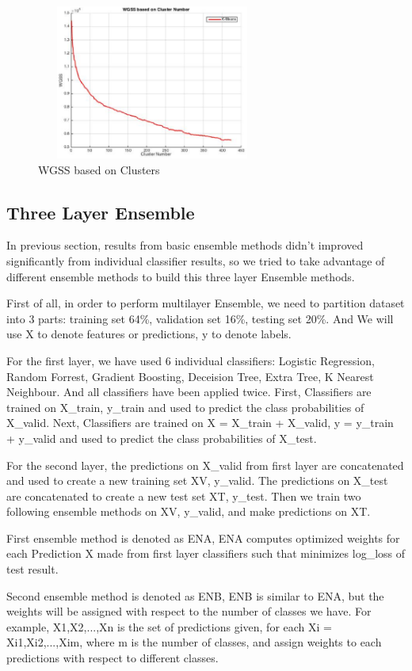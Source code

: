 \documentclass{sig-alternate-05-2015}
\begin{document}
\begin{figure}
\centering
\includegraphics[height=2in,width=3in]{K_Means}
\caption{WGSS based on Clusters}
\label{fig:k means}
\end{figure}

\FloatBarrier
\subsection{Three Layer Ensemble}
In previous section, results from basic ensemble methods didn't improved significantly from individual classifier results, so we tried to take advantage of different ensemble methods to build this three layer Ensemble methods\cite{3layer}.

First of all, in order to perform multilayer Ensemble, we need to partition dataset into 3 parts: training set 64\%, validation set 16\%, testing set 20\%. And We will use X to denote features or predictions, y to denote labels.

For the first layer, we have used 6 individual classifiers: Logistic Regression, Random Forrest, Gradient Boosting, Deceision Tree, Extra Tree, K Nearest Neighbour. And all classifiers have been applied twice. First, Classifiers are trained on X\_train, y\_train and used to predict the class probabilities of X\_valid. Next, Classifiers are trained on X = X\_train + X\_valid, y = y\_train + y\_valid and used to predict the class probabilities of X\_test.

For the second layer, the predictions on X\_valid from first layer are concatenated and used to create a new training set XV, y\_valid. The predictions on X\_test are concatenated to create a new test set XT, y\_test. Then we train two following ensemble methods on XV, y\_valid, and make predictions on XT.

First ensemble method is denoted as ENA, ENA computes optimized weights for each Prediction X made from first layer classifiers such that minimizes log\_loss of test result.

Second ensemble method is denoted as ENB, ENB is similar to ENA, but the weights will be assigned with respect to the number of classes we have. For example, X1,X2,...,Xn is the set of predictions given, for each Xi = Xi1,Xi2,...,Xim, where m is the number of classes, and assign weights to each predictions with respect to different classes.
\end{document}

